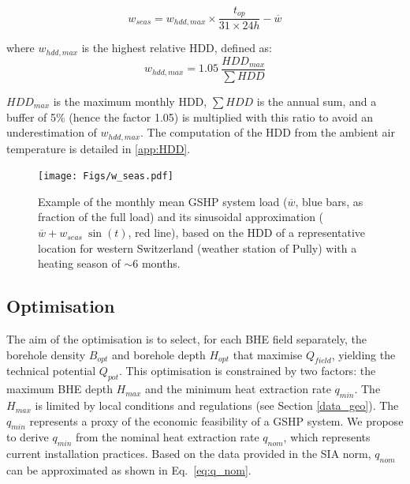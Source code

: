 \begin{equation}
\label{eq:w_seas}
    w_{seas} = w_{hdd,max} \times \frac{t_{op}}{31\times24h} - \overline{w} %
\end{equation}

where $w_{hdd,max}$ is the highest relative HDD, defined as:
\begin{equation}
\label{eq:w_HDD}
    w_{hdd,max} = 1.05 \  \frac{HDD_{max}}{\sum HDD}
\end{equation}

$HDD_{max}$ is the maximum monthly HDD, $\sum HDD$ is the annual sum, and a buffer of 5\% (hence the factor 1.05) is multiplied with this ratio to avoid an underestimation of $w_{hdd,max}$.
The computation of the HDD from the ambient air temperature is detailed in \ref{app:HDD}.

\begin{figure}[tb]
\centering
\texttt{[image: Figs/w\_seas.pdf]} 
\caption{Example of the monthly mean GSHP system load ($\overline{w}$, blue bars, as fraction of the full load) and its sinusoidal approximation ($\overline{w} + w_{seas} \ \sin(t)$, red line), based on the HDD of a representative location for western Switzerland (weather station of Pully) with a heating season of $\sim 6$ months.}
\label{fig:w_seas}
\end{figure}

\subsection{Optimisation}
\label{optimisation}

The aim of the optimisation is to select, for each BHE field separately, the borehole density $B_{opt}$ and borehole depth $H_{opt}$ that maximise $Q_{field}$, yielding the technical potential $Q_{pot}$.
This optimisation is constrained by two factors: the maximum BHE depth $H_{max}$ and the minimum heat extraction rate $q_{min}$.
The $H_{max}$ is limited by local conditions and regulations (see Section \ref{data_geo}).
The $q_{min}$ represents a proxy of the economic feasibility of a GSHP system. 
We propose to derive $q_{min}$ from the nominal heat extraction rate $q_{nom}$, which represents current installation practices. 
Based on the data provided in the SIA norm, $q_{nom}$ can be approximated as shown in Eq.~\ref{eq:q_nom}.


